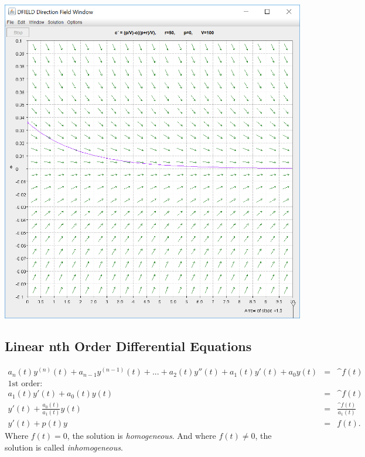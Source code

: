 \documentclass[10pt]{article}
\begin{document}
            \begin{center}\includegraphics[scale=0.5]{lab1p3p10.PNG}\end{center}
    
    
    \newpage

    \subsection{Linear nth Order Differential Equations}
    
        \begin{eqnarray*}
            a_n(t)y^{(n)}(t)+a_{n-1}y^{(n-1)}(t)+ ... + a_2(t)y''(t)+a_1(t)y'(t)+a_0y(t)&=&{\^f}(t)\\
            \text{1st order:}\\
            a_1(t)y'(t)+a_0(t)y(t)&=&\^f(t)\\
            y'(t)+\frac{a_0(t)}{a_1(t)}y(t)&=&\frac{\^f(t)}{a_1(t)}\\
            y'(t)+p(t)y&=&f(t).
        \end{eqnarray*}
        Where $f(t)=0$, the solution is {\it homogeneous}. And where $f(t)\neq 0$, the solution is called {\it inhomogeneous}.
        
\end{document}
